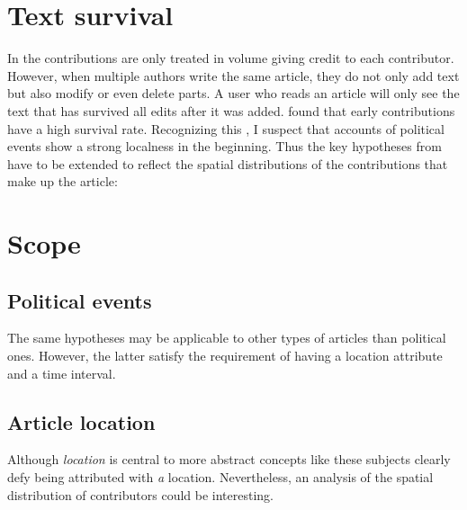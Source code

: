 
\section{Text survival}\label{sec:textsurvival}

In  the contributions are only treated in volume giving credit to each contributor.
However, when multiple authors write the same article, they do not only add text but also modify or even delete parts.
A user who reads an article will only see the text that has survived all edits after it was added.
\textcite{viegas2004history} found that early contributions have a high survival rate.
Recognizing this , I suspect that accounts of political events show a strong localness in the beginning.
Thus the key hypotheses from  have to be extended to reflect the spatial distributions of the contributions that make up the article:



\section{Scope}

\subsection{Political events}
The same hypotheses may be applicable to other types of articles than political ones.
However, the latter satisfy the requirement of having a location attribute and a time interval.

\subsection{Article location}
Although \emph{location} is central to more abstract concepts like  these subjects clearly defy being attributed with \emph{a} location.
Nevertheless, an analysis of the spatial distribution of contributors could be interesting. 